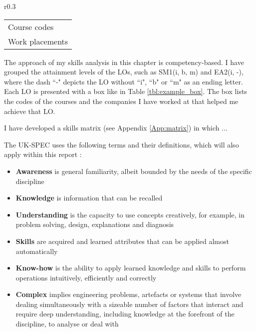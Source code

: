 \begin{wraptable}{r}{0.3\textwidth}
	\centering
	\caption{Example box}
	\label{tbl:example_box}
	\begin{tabular}{|l|}
			\hline
			\rowcolor[HTML]{F8A102} 
			\multicolumn{1}{|c|}{\cellcolor[HTML]{F8A102}\textbf{LO(i, b, m) \nomaster / \master}} \\ \hline
			Course codes \\
			Work placements \\ \hline
	\end{tabular}
\end{wraptable}

The approach of my skills analysis in this chapter is competency-based.
I have grouped the attainment levels of the LOs, such as SM1(i, b, m) and EA2(i, -), where the dash ``-" depicts the LO without ``i", ``b" or ``m" as an ending letter.
Each LO is presented with a box like in Table \ref{tbl:example_box}.
The box lists the codes of the courses and the companies I have worked at that helped me achieve that LO.

I have developed a skills matrix (see Appendix \ref{App:matrix}) in which ...

The UK-SPEC uses the following terms and their definitions, which will also apply within this report \citep{EngineeringCouncil2014}:
\begin{itemize}
    \item \textbf{Awareness} is general familiarity, albeit bounded by the needs of the specific discipline

    \item \textbf{Knowledge} is information that can be recalled

    \item \textbf{Understanding} is the capacity to use concepts creatively, for example, in problem solving, design, explanations and diagnosis

    \item \textbf{Skills} are acquired and learned attributes that can be applied almost automatically

    \item \textbf{Know-how} is the ability to apply learned knowledge and skills to perform operations intuitively, efficiently and correctly

    \item \textbf{Complex} implies engineering problems, artefacts or systems that involve dealing simultaneously with a sizeable number of factors that interact and require deep understanding, including knowledge at the forefront of the discipline, to analyse or deal with

\end{itemize}





